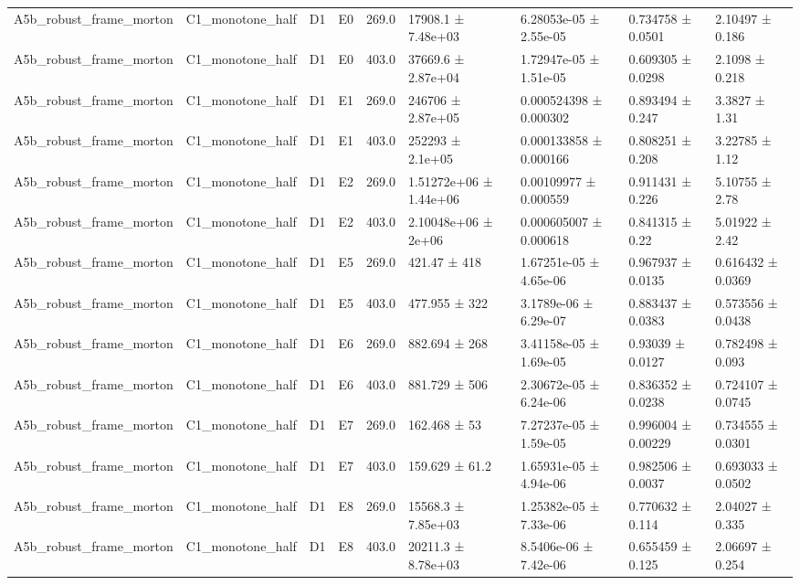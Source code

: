 \begin{table}
\begin{tabular}{lllllllll}
A5b\_robust\_frame\_morton & C1\_monotone\_half & D1 & E0 & 269.0 & 17908.1 ± 7.48e+03 & 6.28053e-05 ± 2.55e-05 & 0.734758 ± 0.0501 & 2.10497 ± 0.186 \\
A5b\_robust\_frame\_morton & C1\_monotone\_half & D1 & E0 & 403.0 & 37669.6 ± 2.87e+04 & 1.72947e-05 ± 1.51e-05 & 0.609305 ± 0.0298 & 2.1098 ± 0.218 \\
A5b\_robust\_frame\_morton & C1\_monotone\_half & D1 & E1 & 269.0 & 246706 ± 2.87e+05 & 0.000524398 ± 0.000302 & 0.893494 ± 0.247 & 3.3827 ± 1.31 \\
A5b\_robust\_frame\_morton & C1\_monotone\_half & D1 & E1 & 403.0 & 252293 ± 2.1e+05 & 0.000133858 ± 0.000166 & 0.808251 ± 0.208 & 3.22785 ± 1.12 \\
A5b\_robust\_frame\_morton & C1\_monotone\_half & D1 & E2 & 269.0 & 1.51272e+06 ± 1.44e+06 & 0.00109977 ± 0.000559 & 0.911431 ± 0.226 & 5.10755 ± 2.78 \\
A5b\_robust\_frame\_morton & C1\_monotone\_half & D1 & E2 & 403.0 & 2.10048e+06 ± 2e+06 & 0.000605007 ± 0.000618 & 0.841315 ± 0.22 & 5.01922 ± 2.42 \\
A5b\_robust\_frame\_morton & C1\_monotone\_half & D1 & E5 & 269.0 & 421.47 ± 418 & 1.67251e-05 ± 4.65e-06 & 0.967937 ± 0.0135 & 0.616432 ± 0.0369 \\
A5b\_robust\_frame\_morton & C1\_monotone\_half & D1 & E5 & 403.0 & 477.955 ± 322 & 3.1789e-06 ± 6.29e-07 & 0.883437 ± 0.0383 & 0.573556 ± 0.0438 \\
A5b\_robust\_frame\_morton & C1\_monotone\_half & D1 & E6 & 269.0 & 882.694 ± 268 & 3.41158e-05 ± 1.69e-05 & 0.93039 ± 0.0127 & 0.782498 ± 0.093 \\
A5b\_robust\_frame\_morton & C1\_monotone\_half & D1 & E6 & 403.0 & 881.729 ± 506 & 2.30672e-05 ± 6.24e-06 & 0.836352 ± 0.0238 & 0.724107 ± 0.0745 \\
A5b\_robust\_frame\_morton & C1\_monotone\_half & D1 & E7 & 269.0 & 162.468 ± 53 & 7.27237e-05 ± 1.59e-05 & 0.996004 ± 0.00229 & 0.734555 ± 0.0301 \\
A5b\_robust\_frame\_morton & C1\_monotone\_half & D1 & E7 & 403.0 & 159.629 ± 61.2 & 1.65931e-05 ± 4.94e-06 & 0.982506 ± 0.0037 & 0.693033 ± 0.0502 \\
A5b\_robust\_frame\_morton & C1\_monotone\_half & D1 & E8 & 269.0 & 15568.3 ± 7.85e+03 & 1.25382e-05 ± 7.33e-06 & 0.770632 ± 0.114 & 2.04027 ± 0.335 \\
A5b\_robust\_frame\_morton & C1\_monotone\_half & D1 & E8 & 403.0 & 20211.3 ± 8.78e+03 & 8.5406e-06 ± 7.42e-06 & 0.655459 ± 0.125 & 2.06697 ± 0.254 \\

\end{tabular}
\end{table}
